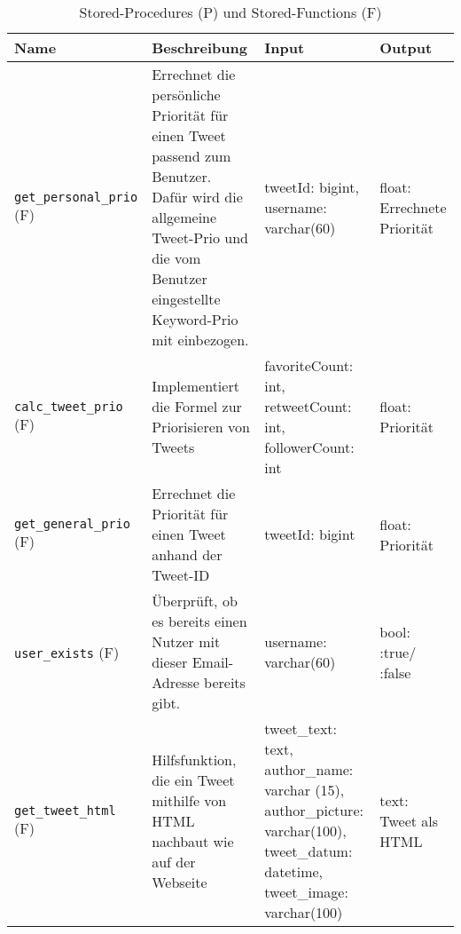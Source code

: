 \begin{table}[!ht]
\small 
\caption{Stored-Procedures (P) und Stored-Functions (F)}
  \begin{tabular}{p{3.3cm}p{5.4cm}p{3.2cm}p{1.8cm}}
    \toprule 
    \textbf{Name} & \textbf{Beschreibung} & \textbf{Input} & \textbf{Output} \\
    \hline
    \texttt{get\_personal\_prio} (F) & Errechnet die persönliche Priorität für einen Tweet passend zum Benutzer. Dafür wird die allgemeine Tweet-Prio und die vom Benutzer eingestellte Keyword-Prio mit einbezogen. & tweetId: bigint, \newline username: \newline varchar(60) & float: \newline Errechnete Priorität \\
    \texttt{calc\_tweet\_prio} (F) & Implementiert die Formel zur Priorisieren von Tweets & favoriteCount: int, \newline retweetCount: int, followerCount: int & float: \newline Priorität \\
    \texttt{get\_general\_prio} (F) & Errechnet die Priorität für einen Tweet anhand der Tweet-ID & tweetId: bigint  & float: \newline Priorität \\
     \texttt{user\_exists} (F) & Überprüft, ob es bereits einen Nutzer mit dieser Email-Adresse bereits gibt.  & username: \newline varchar(60) & bool: \newline 1:true/ \newline 0:false \\
 	 \texttt{get\_tweet\_html} (F) & Hilfsfunktion, die ein Tweet mithilfe von HTML nachbaut wie auf der Webseite & tweet\_text: text, \newline author\_name: \newline varchar (15), \newline author\_picture: \newline varchar(100), tweet\_datum: \newline datetime, \newline tweet\_image: \newline varchar(100) & text: \newline Tweet \newline als HTML \\

\end{tabular}
\end{table}
